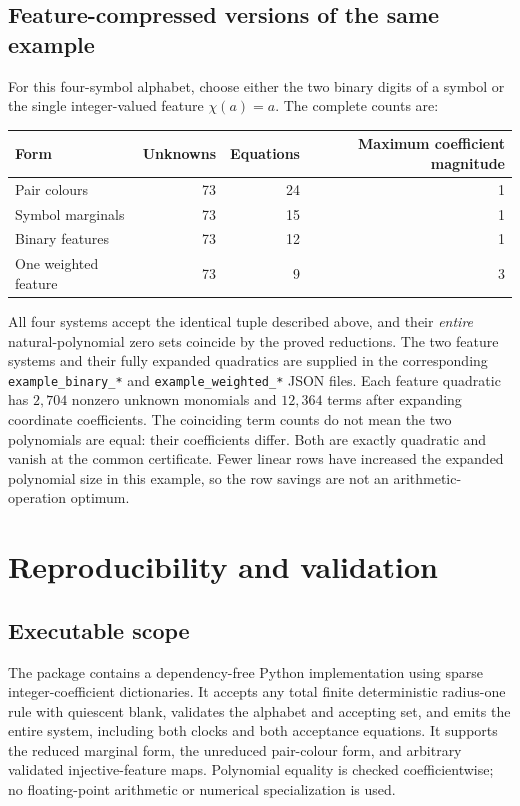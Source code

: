 \documentclass[11pt,letterpaper]{article}
\numberwithin{equation}{section}
\theoremstyle{definition}
\newcommand{\codename}[1]{\texttt{\small #1}}
\begin{document}
\subsection{Feature-compressed versions of the same example}

For this four-symbol alphabet, choose either the two binary digits of a
symbol or the single integer-valued feature $\chi(a)=a$. The complete
counts are:
\begin{center}
\begin{tabular}{@{}lrrr@{}}
\toprule
Form & Unknowns & Equations & Maximum coefficient magnitude\\
\midrule
Pair colours & 73 & 24 & 1\\
Symbol marginals & 73 & 15 & 1\\
Binary features & 73 & 12 & 1\\
One weighted feature & 73 & 9 & 3\\
\bottomrule
\end{tabular}
\end{center}
All four systems accept the identical tuple described above, and their
\emph{entire} natural-polynomial zero sets coincide by the proved
reductions. The two feature systems and their fully expanded quadratics
are supplied in the corresponding \codename{example\_binary\_*} and
\codename{example\_weighted\_*} JSON files. Each feature quadratic has
$2{,}704$ nonzero unknown monomials and $12{,}364$ terms after expanding
coordinate coefficients. The coinciding term counts do not mean the two
polynomials are equal: their coefficients differ. Both are exactly
quadratic and vanish at the common certificate. Fewer linear rows have
increased the expanded polynomial size in this example, so the row savings
are not an arithmetic-operation optimum.

\section{Reproducibility and validation}
\label{pwh:uh:sec:validation}

\subsection{Executable scope}

The package contains a dependency-free Python implementation using sparse
integer-coefficient dictionaries. It accepts any total finite deterministic
radius-one rule with quiescent blank, validates the alphabet and accepting
set, and emits the entire system, including both clocks and both
acceptance equations. It supports the reduced marginal form, the
unreduced pair-colour form, and arbitrary validated injective-feature maps. Polynomial equality is checked coefficientwise;
no floating-point arithmetic or numerical specialization is used.
\end{document}
